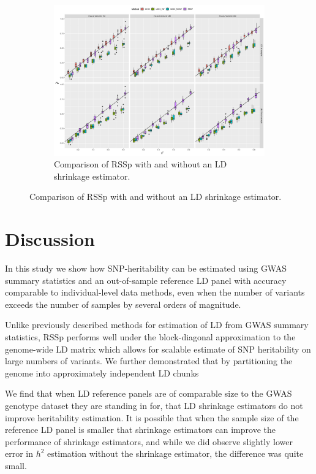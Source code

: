   \begin{figure}
      \centering
  \begin{subfigure}[t]{\textwidth}
    \centering
    \includegraphics[width=.9\linewidth]{img/rssp_sparsity.png}
    \caption{Comparison of RSSp with and without an LD shrinkage estimator.}\label{fig:rssp_sp_method_comparison}
  \end{subfigure}
\end{figure}







\section{Discussion}\label{sec:orge95691e}


In this study we show how SNP-heritability can be estimated using GWAS summary statistics and an out-of-sample reference LD panel with accuracy comparable to individual-level data methods, even when the number of variants exceeds the number of samples by several orders of magnitude.

Unlike previously described methods for estimation of LD from GWAS summary statistics, RSSp performs well under the block-diagonal approximation to the genome-wide LD matrix which allows for scalable estimate of SNP heritability on large numbers of variants. We further demonstrated that by partitioning the genome into approximately independent LD chunks 

We find that when LD reference panels are of comparable size to the GWAS genotype dataset they are standing in for, that LD shrinkage estimators do not improve heritability estimation.  It is possible that when the sample size of the reference LD panel is smaller that shrinkage estimators can improve the performance of shrinkage estimators, and while we did observe slightly lower error in $h^2$ estimation without the shrinkage estimator, the difference was quite small.  

